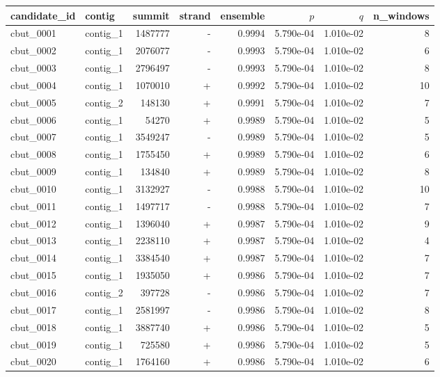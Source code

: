 \documentclass{article}
\begin{document}
{\def\LTcaptype{none} %
\begin{center}
\begin{tabular}{llrrrrrr}
\toprule
candidate\_id & contig & summit & strand & ensemble & $p$ & $q$ & n\_windows \\
\midrule
cbut\_0001 & contig\_1 & 1487777 & - & 0.9994 & 5.790e-04 & 1.010e-02 & 8 \\
cbut\_0002 & contig\_1 & 2076077 & - & 0.9993 & 5.790e-04 & 1.010e-02 & 6 \\
cbut\_0003 & contig\_1 & 2796497 & - & 0.9993 & 5.790e-04 & 1.010e-02 & 8 \\
cbut\_0004 & contig\_1 & 1070010 & + & 0.9992 & 5.790e-04 & 1.010e-02 & 10 \\
cbut\_0005 & contig\_2 & 148130 & + & 0.9991 & 5.790e-04 & 1.010e-02 & 7 \\
cbut\_0006 & contig\_1 & 54270 & + & 0.9989 & 5.790e-04 & 1.010e-02 & 5 \\
cbut\_0007 & contig\_1 & 3549247 & - & 0.9989 & 5.790e-04 & 1.010e-02 & 5 \\
cbut\_0008 & contig\_1 & 1755450 & + & 0.9989 & 5.790e-04 & 1.010e-02 & 6 \\
cbut\_0009 & contig\_1 & 134840 & + & 0.9989 & 5.790e-04 & 1.010e-02 & 8 \\
cbut\_0010 & contig\_1 & 3132927 & - & 0.9988 & 5.790e-04 & 1.010e-02 & 10 \\
cbut\_0011 & contig\_1 & 1497717 & - & 0.9988 & 5.790e-04 & 1.010e-02 & 7 \\
cbut\_0012 & contig\_1 & 1396040 & + & 0.9987 & 5.790e-04 & 1.010e-02 & 9 \\
cbut\_0013 & contig\_1 & 2238110 & + & 0.9987 & 5.790e-04 & 1.010e-02 & 4 \\
cbut\_0014 & contig\_1 & 3384540 & + & 0.9987 & 5.790e-04 & 1.010e-02 & 7 \\
cbut\_0015 & contig\_1 & 1935050 & + & 0.9986 & 5.790e-04 & 1.010e-02 & 7 \\
cbut\_0016 & contig\_2 & 397728 & - & 0.9986 & 5.790e-04 & 1.010e-02 & 7 \\
cbut\_0017 & contig\_1 & 2581997 & - & 0.9986 & 5.790e-04 & 1.010e-02 & 8 \\
cbut\_0018 & contig\_1 & 3887740 & + & 0.9986 & 5.790e-04 & 1.010e-02 & 5 \\
cbut\_0019 & contig\_1 & 725580 & + & 0.9986 & 5.790e-04 & 1.010e-02 & 5 \\
cbut\_0020 & contig\_1 & 1764160 & + & 0.9986 & 5.790e-04 & 1.010e-02 & 6 \\
\bottomrule
\end{tabular}
\end{center}
}
\end{document}
